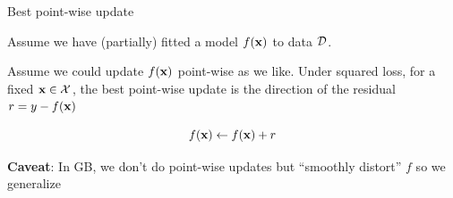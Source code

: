 \documentclass[11pt,compress,t,notes=noshow, xcolor=table]{beamer}
\begin{document}
\begin{frame}[t]{Best point-wise update}

    Assume we have (partially) fitted a model $f(\mathbf{x})$ to data $\mathcal{D}$. 

\lz 

Assume we could update $f(\mathbf{x})$ point-wise as we like. Under squared loss, for a fixed $\mathbf{x} \in \mathcal{X}$, the best point-wise update is the direction of the residual $r = y - f(\mathbf{x})$

$$
	f(\mathbf{x}) \leftarrow f(\mathbf{x}) + r
$$


\begin{overlayarea}{\textwidth}{\textheight}
\begin{center}
\end{center}
\vspace{-0.5cm}
\footnotesize{\textbf{Caveat}: In GB, we don't do point-wise updates but ``smoothly distort'' $f$ so we generalize}
\end{overlayarea} 

\end{frame}
\end{document}
